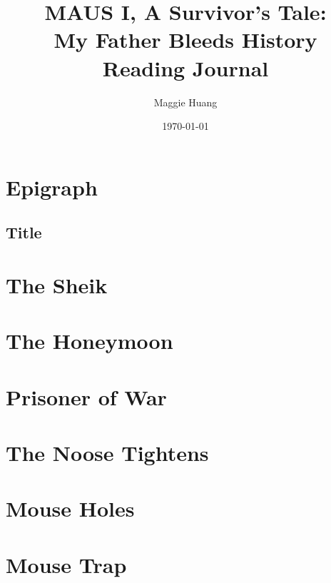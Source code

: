 \documentclass{article}
\title{MAUS I, A Survivor's Tale:\\
My Father Bleeds History\\
Reading Journal}
\author{Maggie Huang}
\date{\today}
\begin{document}
\maketitle{}

\newpage

\tableofcontents

\newpage



\section{Epigraph}
\subsection{Title}




\section{The Sheik}








\section{The Honeymoon}







\section{Prisoner of War}








\section{The Noose Tightens}







\section{Mouse Holes}






\section{Mouse Trap}
\end{document}
